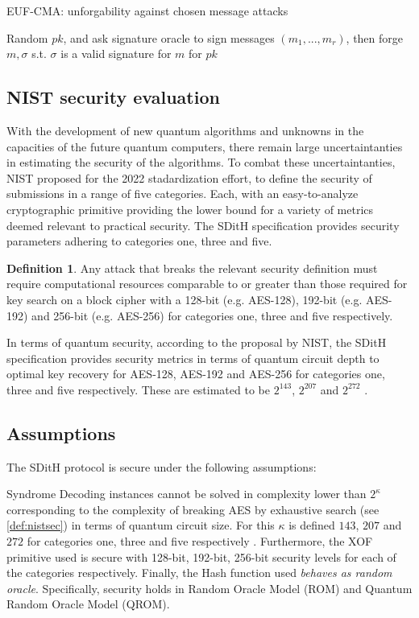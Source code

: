 \documentclass[twoside,11pt,openright]{report}
\theoremstyle{definition}
\newtheorem{definition}{Definition}[section]
\theoremstyle{plain}
\begin{document}
EUF-CMA: unforgability against chosen message attacks

Random $pk$, and ask signature oracle to sign messages $(m_1, ..., m_r)$, then forge $m, \sigma$ s.t. $\sigma$ is a valid signature for $m$ for $pk$


\subsection{NIST security evaluation}
\label{sec:nistsec}

With the development of new quantum algorithms and unknowns in the capacities of the future quantum computers, there remain large uncertaintanties in estimating the security of the algorithms. To combat these uncertaintanties, NIST proposed for the 2022 stadardization effort, to define the security of submissions in a range of five categories. Each, with an easy-to-analyze cryptographic primitive providing the lower bound for a variety of metrics deemed relevant to practical security. The SDitH specification provides security parameters adhering to categories one, three and five.

\begin{definition}
  \label{def:nistsec}
  Any attack that breaks the relevant security definition must require computational resources comparable to or greater than those required for key search on a block cipher with a 128-bit (e.g. AES-128), 192-bit (e.g. AES-192) and 256-bit (e.g. AES-256) for categories one, three and five respectively.
\end{definition}

In terms of quantum security, according to the proposal by NIST, the SDitH specification provides security metrics in terms of quantum circuit depth to optimal key recovery for AES-128, AES-192 and AES-256 for categories one, three and five respectively. These are estimated to be $2^{143}$, $2^{207}$ and $2^{272}$ \cite{nistcall}.

\subsection{Assumptions}
\label{sec:assumptions}
The SDitH protocol is secure under the following assumptions:

Syndrome Decoding instances cannot be solved in complexity lower than $2^\kappa$ corresponding to the complexity of breaking AES by exhaustive search (see \autoref{def:nistsec}) in terms of quantum circuit size. For this $\kappa$ is defined $143$, $207$ and $272$ for categories one, three and five respectively \cite{nistcall}. Furthermore, the XOF primitive used is secure with 128-bit, 192-bit, 256-bit security levels for each of the categories respectively. Finally, the Hash function used \textit{behaves as random oracle}. Specifically, security holds in Random Oracle Model (ROM) and Quantum Random Oracle Model (QROM).
\end{document}
